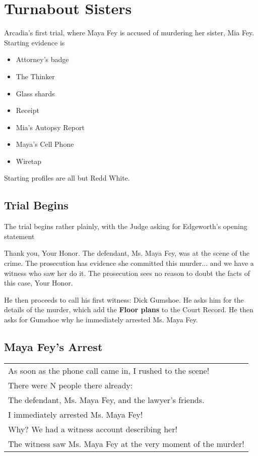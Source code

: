 \section{Turnabout Sisters}

Arcadia's first trial, where Maya Fey is accused of murdering her sister, Mia Fey. Starting evidence is 
\begin{itemize}
\item Attorney's badge
\item The Thinker
\item Glass shards
\item Receipt
\item Mia's Autopsy Report
\item Maya's Cell Phone
\item Wiretap
\end{itemize}

Starting profiles are all but Redd White.

\subsection{Trial Begins}

The trial begins rather plainly, with the Judge asking for Edgeworth's opening statement
\begin{center}
Thank you, Your Honor. The defendant, Ms. Maya Fey, was at the scene of the crime. The prosecution has evidence she committed this murder... and we have a witness who saw her do it. The prosecution sees no reason to doubt the facts of this case, Your Honor. 
\end{center}

He then proceeds to call his first witness: Dick Gumshoe. He asks him for the details of the murder, which add the \textbf{Floor plans} to the Court Record. He then asks for Gumshoe why he immediately arrested Ms. Maya Fey.

\subsection{Maya Fey's Arrest}
\begin{tabular}{p{11cm}}
As soon as the phone call came in, I rushed to the scene!\\
There were N people there already:\\
The defendant, Ms. Maya Fey, and the lawyer's friends. \\
I immediately arrested Ms. Maya Fey!\\
Why? We had a witness account describing her!\\
The witness saw Ms. Maya Fey at the very moment of the murder!\end{tabular}

